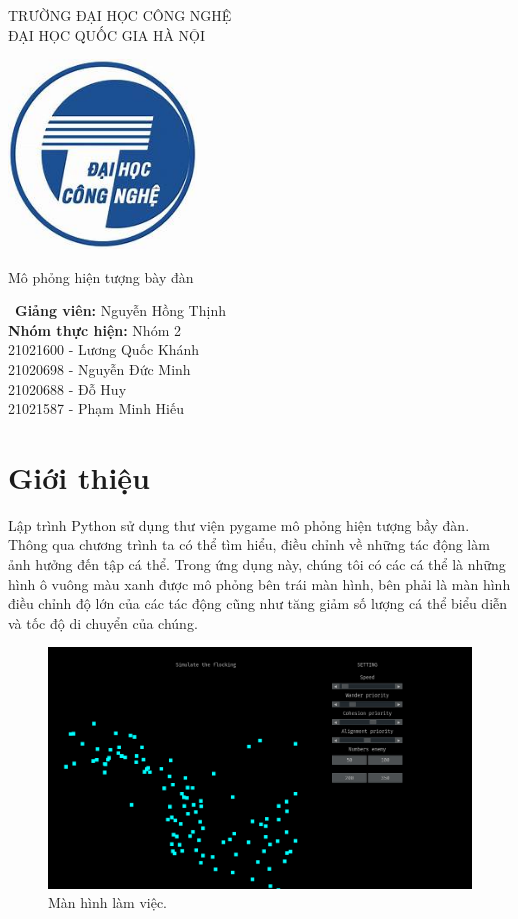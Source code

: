 \documentclass{article}
\newcommand{\mylogo}{\includegraphics[width=5cm]{logo.png}}
\begin{document}
\begin{titlepage}
\begin{center}
    \fontsize{18}{22}\selectfont
    TRƯỜNG ĐẠI HỌC CÔNG NGHỆ\\
    ĐẠI HỌC QUỐC GIA HÀ NỘI
\end{center}
\vspace{1cm}
\centering
\mylogo 
\vspace{2cm}

\Huge{Mô phỏng hiện tượng bày đàn}\\[1ex]
\vspace{3cm}
\begin{flushleft} 
    \fontsize{17}{12}\
    \textbf{Giảng viên:} Nguyễn Hồng Thịnh \\
    \textbf{Nhóm thực hiện:} Nhóm 2 \\
    \hspace{4em} 21021600 - Lương Quốc Khánh \\
    \hspace{4em} 21020698 - Nguyễn Đức Minh \\
    \hspace{4em} 21020688 - Đỗ Huy \\
    \hspace{4em} 21021587 - Phạm Minh Hiếu \\
\end{flushleft}
\end{titlepage}
\section{Giới thiệu}

Lập trình Python sử dụng thư viện pygame mô phỏng hiện tượng bầy đàn. Thông qua chương trình ta có thể tìm hiểu, điều chỉnh về những tác động làm ảnh hưởng đến tập cá thể.
Trong ứng dụng này, chúng tôi có các cá thể là những hình ô vuông màu xanh được mô phỏng bên trái màn hình, bên phải là màn hình điều chỉnh độ lớn của các tác động cũng như tăng giảm số lượng cá thể biểu diễn và tốc độ di chuyển của chúng.

\begin{figure}[htbp]
  \centering
  \includegraphics[width=0.5\linewidth]{demo.png} 
  \caption{Màn hình làm việc.}
\end{figure}
\end{document}
